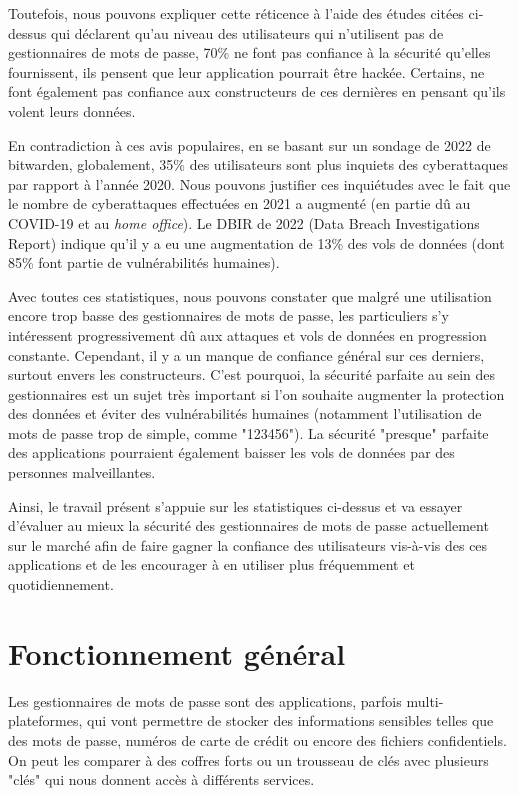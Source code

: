 Toutefois, nous pouvons expliquer cette réticence à l'aide des études citées ci-dessus qui déclarent qu'au niveau des utilisateurs qui n'utilisent pas de gestionnaires de mots de passe, 70\% ne font pas confiance à la sécurité qu'elles fournissent, ils pensent que leur application pourrait être hackée. Certains, ne font également pas confiance aux constructeurs de ces dernières en pensant qu'ils volent leurs données.

En contradiction à ces avis populaires, en se basant sur un sondage de 2022 de bitwarden\cite{bitwardenreport}, globalement, 35\% des utilisateurs sont plus inquiets des cyberattaques par rapport à l'année 2020. Nous pouvons justifier ces inquiétudes avec le fait que le nombre de cyberattaques effectuées en 2021 a augmenté (en partie dû au COVID-19 et au \textit{home office}). Le DBIR de 2022 (Data Breach Investigations Report)\cite{dbir} indique qu'il y a eu une augmentation de 13\% des vols de données (dont 85\% font partie de vulnérabilités humaines).

Avec toutes ces statistiques, nous pouvons constater que malgré une utilisation encore trop basse des gestionnaires de mots de passe, les particuliers s'y intéressent progressivement dû aux attaques et vols de données en progression constante. Cependant, il y a un manque de confiance général sur ces derniers, surtout envers les constructeurs. C'est pourquoi, la sécurité parfaite au sein des gestionnaires est un sujet très important si l'on souhaite augmenter la protection des données et éviter des vulnérabilités humaines (notamment l'utilisation de mots de passe trop de simple, comme "123456"). La sécurité "presque" parfaite des applications pourraient également baisser les vols de données par des personnes malveillantes. 

Ainsi, le travail présent s'appuie sur les statistiques ci-dessus et va essayer d'évaluer au mieux la sécurité des gestionnaires de mots de passe actuellement sur le marché afin de faire gagner la confiance des utilisateurs vis-à-vis des ces applications et de les encourager à en utiliser plus fréquemment et quotidiennement.

\section{Fonctionnement général}

Les gestionnaires de mots de passe sont des applications, parfois multi-plateformes, qui vont permettre de stocker des informations sensibles telles que des mots de passe, numéros de carte de crédit ou encore des fichiers confidentiels. On peut les comparer à des coffres forts ou un trousseau de clés avec plusieurs "clés" qui nous donnent accès à différents services.  

